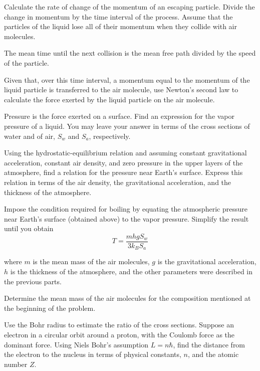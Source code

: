 \documentclass[11pt]{article}
\begin{document}
\begin{pproblem}
\begin{alternativas}
\item Calculate the rate of change of the momentum of an escaping particle. Divide the change in momentum by the time interval of the process. Assume that the particles of the liquid lose all of their momentum when they collide with air molecules.

The mean time until the next collision is the mean free path divided by the speed of the particle.

Given that, over this time interval, a momentum equal to the momentum of the liquid particle is transferred to the air molecule, use Newton's second law to calculate the force exerted by the liquid particle on the air molecule.

\item Pressure is the force exerted on a surface. Find an expression for the vapor pressure of a liquid. You may leave your answer in terms of the cross sections of water and of air, \(S_w\) and \(S_a\), respectively.

\item Using the hydrostatic-equilibrium relation and assuming constant gravitational acceleration, constant air density, and zero pressure in the upper layers of the atmosphere, find a relation for the pressure near Earth's surface. Express this relation in terms of the air density, the gravitational acceleration, and the thickness of the atmosphere.

\item Impose the condition required for boiling by equating the atmospheric pressure near Earth's surface (obtained above) to the vapor pressure. Simplify the result until you obtain
\begin{equation}
    T = \frac{mhg S_w}{3k_B S_a}
\end{equation}

where $m$ is the mean mass of the air molecules, $g$ is the gravitational acceleration, $h$ is the thickness of the atmosphere, and the other parameters were described in the previous parts.

\item Determine the mean mass of the air molecules for the composition mentioned at the beginning of the problem.

\item Use the Bohr radius to estimate the ratio of the cross sections. Suppose an electron in a circular orbit around a proton, with the Coulomb force as the dominant force. Using Niels Bohr's assumption $L = n\hbar$, find the distance from the electron to the nucleus in terms of physical constants, $n$, and the atomic number $Z$.


\end{alternativas}
\end{pproblem}
\end{document}
